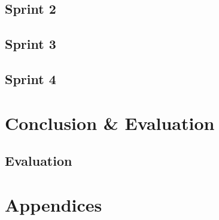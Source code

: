 \documentclass[12pt]{report}
\begin{document}
	

	

	

	

	

	

\chapter{Sprint 2}

	

	

	

	

	

	

	

	

\chapter{Sprint 3}

\chapter{Sprint 4}

\part{Conclusion \& Evaluation}

\chapter{Evaluation}

	

\part{Appendices}

	\appendix
	

	\appendix
	

	\appendix
	

	\appendix
	

	\appendix
	

	\appendix
	

	\appendix
	

	\appendix
	
\end{document}
